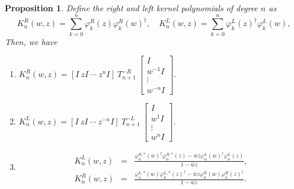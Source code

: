 \documentclass[10pt,a4paper]{amsart}
\newtheorem{prop}{Proposition}
\begin{document}
\begin{prop}\label{prop_kernelCD}
Define the right and left kernel polynomials of degree $n$ as
$$K_{n}^{R}(w,z) = \sum_{k=0}^{n}\varphi_{k}^{R}(z)\varphi_{k}^{R}(w)^{\dag} ,\quad K_{n}^{L}(w,z) = \sum_{k=0}^{n}\varphi_{k}^{L}(z)^{\dag}\varphi_{k}^{L}(w),$$
Then, we have
\begin{enumerate}
\item
$
K_{n}^{R}(w,z)=[I ~ zI ~\cdots ~ z^{n}I]~T_{n+1}^{-R}~\begin{bmatrix}
I \\
w^{-1}I \\
\vdots \\
w^{-n}I
\end{bmatrix}.
$
\item 
$
K_{n}^{L}(w,z)=[I ~ zI ~\cdots ~ z^{-n}I]~T_{n+1}^{-L}~\begin{bmatrix}
I \\
w^{1}I \\
\vdots \\
w^{n}I
\end{bmatrix}.
$
\item \begin{align} \label{cd_right}
K_{n}^{L}(w,z) &=&\frac{\varphi_{n}^{R,*}(w)^{\dag}\varphi_{n}^{R,*}(z) - \bar{w}z\varphi_{n}^{L}(w)^{\dag}\varphi_{n}^{L}(z)}{1-\bar{w}z}, \\ 
\label{cd_left}
K_{n}^{R}(w,z) &=&\frac{\varphi_{n}^{L,*}(w)\varphi_{n}^{L,*}(z)^{\dag} - \bar{w}z\varphi_{n}^{R}(w)\varphi_{n}^{R}(z)^{\dag}}{1-\bar{w}z}. 
\end{align}
\end{enumerate}
\end{prop}
\end{document}
